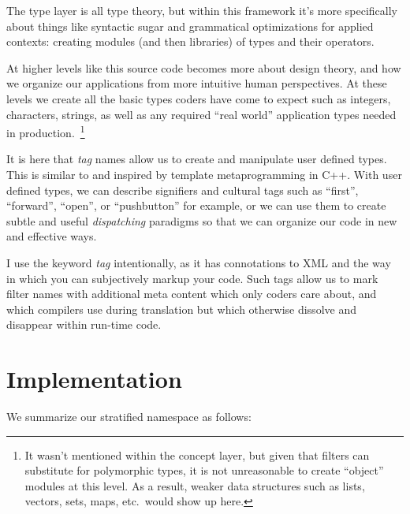 \documentclass[twoside]{article}
\begin{document}
The type layer is all type theory, but within this framework it's more specifically about things like syntactic sugar
and grammatical optimizations for applied contexts: creating modules (and then libraries) of types and their operators.

At higher levels like this source code becomes more about design theory, and how we organize our applications from more
intuitive human perspectives. At these levels we create all the basic types coders have come to expect such as integers,
characters, strings, as well as any required ``real world'' application types needed in production.~\footnote{It wasn't
mentioned within the concept layer, but given that filters can substitute for polymorphic types, it is not unreasonable
to create ``object'' modules at this level. As a result, weaker data structures such as lists, vectors, sets, maps,
etc.~would show up here.}

It is here that \emph{tag} names allow us to create and manipulate user defined types. This is similar to and inspired
by template metaprogramming in C++. With user defined types, we can describe signifiers and cultural tags such as ``first'',
``forward'', ``open'', or ``pushbutton'' for example, or we can use them to create subtle and useful \emph{dispatching}
paradigms so that we can organize our code in new and effective ways.

I use the keyword \emph{tag} intentionally, as it has connotations to XML and the way in which you can subjectively
markup your code. Such tags allow us to mark filter names with additional meta content which only coders care about,
and which compilers use during translation but which otherwise dissolve and disappear within run-time code.

\section*{Implementation}

We summarize our stratified namespace as follows:
\end{document}
